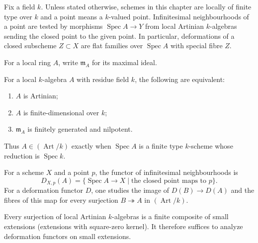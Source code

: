 \begin{convention}\label{fga-con-6-0-1}\uses{}
Fix a field $k$.  Unless stated otherwise, schemes in this chapter are locally
of finite type over $k$ and a point means a $k$-valued point.  Infinitesimal
neighbourhoods of a point are tested by morphisms $\operatorname{Spec}A\to Y$
from local Artinian $k$-algebras sending the closed point to the given point.
In particular, deformations of a closed subscheme $Z\subset X$ are flat families
over $\operatorname{Spec}A$ with special fibre $Z$.
\end{convention}

\begin{convention}\label{fga-con-6-1-1}\uses{}
For a local ring $A$, write $\mathfrak m_A$ for its maximal ideal.
\end{convention}

\begin{remark}\label{fga-rem-6-1-3}\uses{}
For a local $k$-algebra $A$ with residue field $k$, the following are equivalent:
\begin{enumerate}
\item $A$ is Artinian;
\item $A$ is finite-dimensional over $k$;
\item $\mathfrak m_A$ is finitely generated and nilpotent.
\end{enumerate}
Thus $A\in(\operatorname{Art}/k)$ exactly when $\operatorname{Spec}A$ is a finite
type $k$-scheme whose reduction is $\operatorname{Spec}k$.
\end{remark}

\begin{remark}\label{fga-rem-6-1-8}
For a scheme $X$ and a point $p$, the functor of infinitesimal neighbourhoods is
\[
D_{X,p}(A)=\{\operatorname{Spec}A\to X\mid\text{the closed point maps to }p\}.
\]
For a deformation functor $D$, one studies the image of $D(B)\to D(A)$ and
the fibres of this map for every surjection $B\twoheadrightarrow A$ in
$(\operatorname{Art}/k)$.
\end{remark}

\begin{remark}\label{fga-rem-6-1-10}\uses{}
Every surjection of local Artinian $k$-algebras is a finite composite of small
extensions (extensions with square-zero kernel).  It therefore suffices to
analyze deformation functors on small extensions.
\end{remark}

